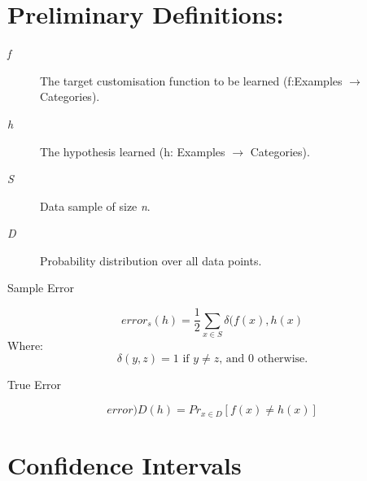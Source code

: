 \documentclass[11pt]{article}
\begin{document}
\section{Preliminary Definitions:}
\label{sec:orgfa3a742}
\begin{description}
\item[{\emph{f}}] The target customisation function to be learned (f:Examples \(\rightarrow\) Categories).
\item[{\emph{h}}] The hypothesis learned (h: Examples \(\rightarrow\) Categories).
\item[{\emph{S}}] Data sample of size \emph{n}.
\item[{\emph{D}}] Probability distribution over all data points.
\item[{Sample Error}] 
\end{description}
\begin{equation}
error_s(h) = \frac{1}{2}\sum\limits_{x\in S} \delta(f(x),h(x)
\end{equation}
Where:
\begin{equation}
\delta(y,z) = \text{1 if }y\neq z\text{, and 0 otherwise.}
\end{equation}
\begin{description}
\item[{True Error}] 
\end{description}
\begin{equation}
error)D(h) = Pr_{x \in D}[f(x)\neq h(x)]
\end{equation}

\section{Confidence Intervals}
\label{sec:orge5f1ec2}
\end{document}
